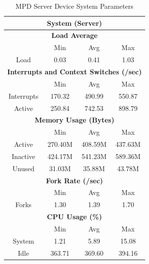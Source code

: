 \documentclass[11pt,a4paper,headinclude=false,footinclude=false]{scrreprt}
\begin{document}
\begin{table}[H]
\centering
    \begin{tabular}{||c|c|c|c|c|c|c||}
    \hline
    \multicolumn{7}{|c|}{\textbf{System (Server)}} \\
    \hline
    \multicolumn{7}{|c|}{\textbf{Load Average}} \\
    \hline\hline
      & \multicolumn{2}{|c|}{Min} & \multicolumn{2}{|c|}{Avg} & \multicolumn{2}{|c|}{Max} \\
    \hline
    Load & \multicolumn{2}{|c|}{0.03} & \multicolumn{2}{|c|}{0.41} & \multicolumn{2}{|c|}{1.03} \\
    \hline\hline
    \multicolumn{7}{|c|}{\textbf{Interrupts and Context Switches (/sec)}} \\
    \hline
      & \multicolumn{2}{|c|}{Min} & \multicolumn{2}{|c|}{Avg} & \multicolumn{2}{|c|}{Max} \\
    \hline
    Interrupts & \multicolumn{2}{|c|}{170.32} & \multicolumn{2}{|c|}{490.99} & \multicolumn{2}{|c|}{550.87} \\
    \hline
    Active & \multicolumn{2}{|c|}{250.84} & \multicolumn{2}{|c|}{742.53} & \multicolumn{2}{|c|}{898.79} \\
    \hline\hline
    \multicolumn{7}{|c|}{\textbf{Memory Usage (Bytes)}} \\
    \hline\hline
      & \multicolumn{2}{|c|}{Min} & \multicolumn{2}{|c|}{Avg} & \multicolumn{2}{|c|}{Max} \\
    \hline
    Active & \multicolumn{2}{|c|}{270.40M} & \multicolumn{2}{|c|}{408.59M} & \multicolumn{2}{|c|}{437.63M} \\
    \hline
    Inactive & \multicolumn{2}{|c|}{424.17M} & \multicolumn{2}{|c|}{541.23M} & \multicolumn{2}{|c|}{589.36M} \\
    \hline
    Unused & \multicolumn{2}{|c|}{31.03M} & \multicolumn{2}{|c|}{35.88M} & \multicolumn{2}{|c|}{43.78M} \\
    \hline\hline
    \multicolumn{7}{|c|}{\textbf{Fork Rate (/sec)}} \\
    \hline\hline
      & \multicolumn{2}{|c|}{Min} & \multicolumn{2}{|c|}{Avg} & \multicolumn{2}{|c|}{Max} \\
    \hline
    Forks & \multicolumn{2}{|c|}{1.30} & \multicolumn{2}{|c|}{1.39} & \multicolumn{2}{|c|}{1.70} \\
    \hline\hline
    \multicolumn{7}{|c|}{\textbf{CPU Usage (\%)}} \\
    \hline\hline
      & \multicolumn{2}{|c|}{Min} & \multicolumn{2}{|c|}{Avg} & \multicolumn{2}{|c|}{Max} \\
    \hline
    System & \multicolumn{2}{|c|}{1.21} & \multicolumn{2}{|c|}{5.89} & \multicolumn{2}{|c|}{15.08} \\
    \hline
    Idle & \multicolumn{2}{|c|}{363.71} & \multicolumn{2}{|c|}{369.60} & \multicolumn{2}{|c|}{394.16} \\
    \hline\hline
    \end{tabular}
    \caption{MPD Server Device System Parameters}
    \label{MPDserverSysTab}
\end{table}
\end{document}
